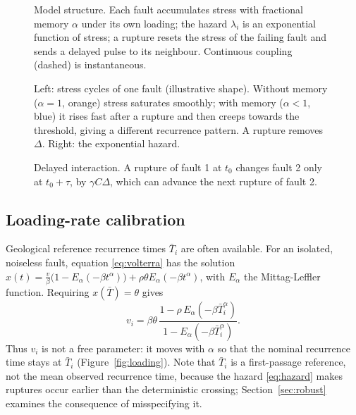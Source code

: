 \documentclass[11pt,a4paper]{article}
\newcommand{\Tb}{\bar T}
\begin{document}
\begin{figure}[t]
\centering
\resizebox{\textwidth}{!}{}
\caption{Model structure. Each fault accumulates stress with fractional memory $\alpha$ under its own loading; the hazard $\lambda_i$ is an exponential function of stress; a rupture resets the stress of the failing fault and sends a delayed pulse to its neighbour. Continuous coupling (dashed) is instantaneous.}\label{fig:schematic}
\end{figure}

\begin{figure}[t]
\centering\resizebox{\textwidth}{!}{\figCycle}
\caption{Left: stress cycles of one fault (illustrative shape). Without memory ($\alpha=1$, orange) stress saturates smoothly; with memory ($\alpha<1$, blue) it rises fast after a rupture and then creeps towards the threshold, giving a different recurrence pattern. A rupture removes $\Delta$. Right: the exponential hazard.}\label{fig:cycle}
\end{figure}

\begin{figure}[t]
\centering\resizebox{0.95\textwidth}{!}{\figDelay}
\caption{Delayed interaction. A rupture of fault 1 at $t_0$ changes fault 2 only at $t_0+\tau$, by $\gamma C\Delta$, which can advance the next rupture of fault 2.}\label{fig:delay}
\end{figure}

\subsection{Loading-rate calibration}
Geological reference recurrence times $\Tb_i$ are often available. For an isolated, noiseless fault, equation \eqref{eq:volterra} has the solution $x(t)=\frac{v}{\beta}\big(1-E_\alpha(-\beta t^\alpha)\big)+\rho\theta E_\alpha(-\beta t^\alpha)$, with $E_\alpha$ the Mittag-Leffler function. Requiring $x(\Tb)=\theta$ gives
\begin{equation}\label{eq:loading}
v_i=\beta\theta\,\frac{1-\rho\,E_\alpha(-\beta\Tb_i^\alpha)}{1-E_\alpha(-\beta\Tb_i^\alpha)} .
\end{equation}
Thus $v_i$ is not a free parameter: it moves with $\alpha$ so that the nominal recurrence time stays at $\Tb_i$ (Figure~\ref{fig:loading}). Note that $\Tb_i$ is a first-passage reference, not the mean observed recurrence time, because the hazard \eqref{eq:hazard} makes ruptures occur earlier than the deterministic crossing; Section~\ref{sec:robust} examines the consequence of misspecifying it.
\end{document}
